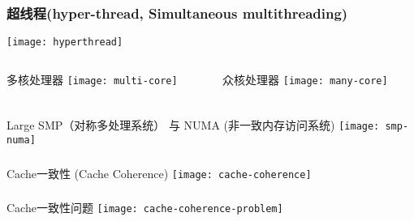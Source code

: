 \begin{frame}	
	\frametitle{超线程\small{(hyper-thread, Simultaneous multithreading)}}
	\centering
	
	\texttt{[image: hyperthread]}
\end{frame}

\begin{frame}
	\begin{columns}
		\begin{column}{.5\textwidth}
			\Large
			多核处理器	
			\texttt{[image: multi-core]}
			
		\end{column}
		
		\begin{column}{.5\textwidth}
			\Large
			众核处理器
			\texttt{[image: many-core]}
			
		\end{column}
	\end{columns}
\end{frame}

\begin{frame}	
	\frametitle{}
	\centering
	Large 
	SMP（对称多处理系统） 与 NUMA (非一致内存访问系统)
	\texttt{[image: smp-numa]}
\end{frame}


\begin{frame}	
	\frametitle{}
	\centering
	\Large 
	Cache一致性 (Cache Coherence)
	\texttt{[image: cache-coherence]}
\end{frame}

\begin{frame}	
	\frametitle{}
	\centering
	\Large 
	Cache一致性问题
	\texttt{[image: cache-coherence-problem]}
\end{frame}











